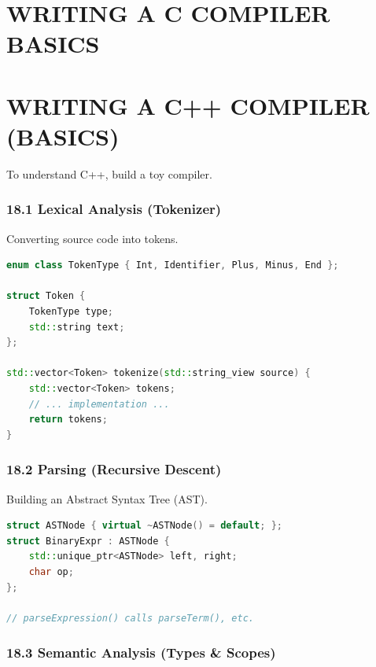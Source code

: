 \hypertarget{writing-a-c-compiler-basics}{%
\chapter{WRITING A C COMPILER
BASICS}\label{writing-a-c-compiler-basics}}

\hypertarget{writing-a-c-compiler-basics-1}{%
\chapter{WRITING A C++ COMPILER
(BASICS)}\label{writing-a-c-compiler-basics-1}}

To understand C++, build a toy compiler.

\hypertarget{lexical-analysis-tokenizer}{%
\subsection{18.1 Lexical Analysis
(Tokenizer)}\label{lexical-analysis-tokenizer}}

Converting source code into tokens.

\begin{lstlisting}[language={C++}]
enum class TokenType { Int, Identifier, Plus, Minus, End };

struct Token {
    TokenType type;
    std::string text;
};

std::vector<Token> tokenize(std::string_view source) {
    std::vector<Token> tokens;
    // ... implementation ...
    return tokens;
}
\end{lstlisting}

\hypertarget{parsing-recursive-descent}{%
\subsection{18.2 Parsing (Recursive
Descent)}\label{parsing-recursive-descent}}

Building an Abstract Syntax Tree (AST).

\begin{lstlisting}[language={C++}]
struct ASTNode { virtual ~ASTNode() = default; };
struct BinaryExpr : ASTNode {
    std::unique_ptr<ASTNode> left, right;
    char op;
};

// parseExpression() calls parseTerm(), etc.
\end{lstlisting}

\hypertarget{semantic-analysis-types-scopes}{%
\subsection{18.3 Semantic Analysis (Types \&
Scopes)}\label{semantic-analysis-types-scopes}}

